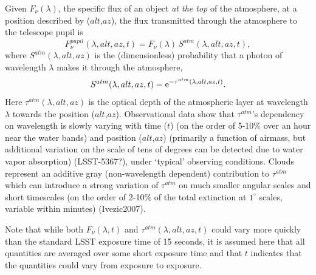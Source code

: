 \documentclass[12pt,preprint]{aastex}
\begin{document}
Given $F_\nu(\lambda)$, the specific flux of an object {\it at
the top} of the atmosphere, at a position described by ($alt$,$az$),
the flux transmitted through the atmosphere to the telescope pupil is
\begin{equation}
\label{eqn:Fpupil}
   F_\nu^{pupil}(\lambda,alt,az,t) = F_\nu(\lambda) \, S^{atm}(\lambda,alt,az,t),
\end{equation}
where $S^{atm}(\lambda,alt,az)$ is the (dimensionless) probability that a photon of 
wavelength $\lambda$ makes it through the atmosphere,
\begin{equation}
\label{eqn:atmTau}
   S^{atm}(\lambda,alt,az,t)   = {\rm e}^{-\tau^{atm}(\lambda,alt,az,t)}.
\end{equation}
Here $\tau^{atm}(\lambda,alt,az)$ is the optical depth of the
atmospheric layer at wavelength $\lambda$ towards the position
($alt$,$az$).  Observational data show that $\tau^{atm}$'s dependency
on wavelength is slowly varying with time ($t$) (on the order of
5-10\% over an hour near the water bands) and position ($alt$,$az$)
(primarily a function of airmass, but additional variation on the
scale of tens of degrees can be detected due to water vapor
absorption) (LSST-5367?), under `typical' observing conditions.  
Clouds represent an additive gray (non-wavelength dependent)
contribution to $\tau^{atm}$ which can introduce a strong variation of
$\tau^{atm}$ on much smaller angular scales and short timescales (on
the order of 2-10\% of the total extinction at $1^{\circ}$ scales,
variable within minutes) (Ivezic2007). 

Note that while both $F_\nu(\lambda,t)$ and $\tau^{atm}(\lambda,alt,az,t)$ 
could vary more quickly than the standard LSST exposure time of 15
seconds, it is assumed here that all quantities are averaged over some
short exposure time and that $t$ indicates that the quantities could
vary from exposure to exposure. 
\end{document}
